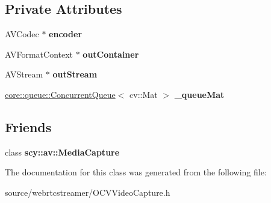\subsection*{Private Attributes}
\begin{DoxyCompactItemize}
\item 
\mbox{\label{class_o_c_v_video_capture_a7d6deb15e9fbf942aeff015b92f9399c}} 
A\+V\+Codec $\ast$ {\bfseries encoder}
\item 
\mbox{\label{class_o_c_v_video_capture_ae0918553fe1809a1c7504d9764b65d42}} 
A\+V\+Format\+Context $\ast$ {\bfseries out\+Container}
\item 
\mbox{\label{class_o_c_v_video_capture_ac86ee7d53af6e74ac5a5a92dbe2ede39}} 
A\+V\+Stream $\ast$ {\bfseries out\+Stream}
\item 
\mbox{\label{class_o_c_v_video_capture_ae0dc887c3fa723cbb973f71f9ae57ca0}} 
\hyperlink{classcore_1_1queue_1_1_concurrent_queue}{core\+::queue\+::\+Concurrent\+Queue}$<$ cv\+::\+Mat $>$ {\bfseries \+\_\+queue\+Mat}
\end{DoxyCompactItemize}
\subsection*{Friends}
\begin{DoxyCompactItemize}
\item 
\mbox{\label{class_o_c_v_video_capture_a2527869a6a006088add740988bfe6e5d}} 
class {\bfseries scy\+::av\+::\+Media\+Capture}
\end{DoxyCompactItemize}


The documentation for this class was generated from the following file\+:\begin{DoxyCompactItemize}
\item 
source/webrtcstreamer/O\+C\+V\+Video\+Capture.\+h\end{DoxyCompactItemize}

